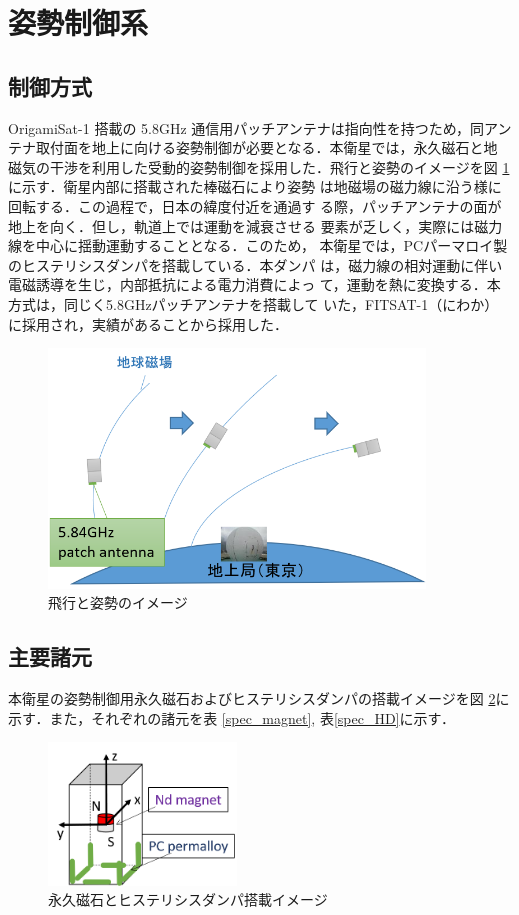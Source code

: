 \section{姿勢制御系}

\subsection{制御方式}
OrigamiSat-1 搭載の 5.8GHz 通信用パッチアンテナは指向性を持つため，同アン
テナ取付面を地上に向ける姿勢制御が必要となる．本衛星では，永久磁石と地
磁気の干渉を利用した受動的姿勢制御を採用した．飛行と姿勢のイメージを図
\ref{image_attitude_ctrl}に示す．衛星内部に搭載された棒磁石により姿勢
は地磁場の磁力線に沿う様に回転する．この過程で，日本の緯度付近を通過す
る際，パッチアンテナの面が地上を向く．但し，軌道上では運動を減衰させる
要素が乏しく，実際には磁力線を中心に揺動運動することとなる．このため，
本衛星では，PCパーマロイ製のヒステリシスダンパを搭載している．本ダンパ
は，磁力線の相対運動に伴い電磁誘導を生じ，内部抵抗による電力消費によっ
て，運動を熱に変換する．本方式は，同じく5.8GHzパッチアンテナを搭載して
いた，FITSAT-1（にわか）に採用され，実績があることから採用した．

\begin{figure}[htbp]
	\centering
	\includegraphics[width=10cm]{03/fig/image_attitude_ctrl.png}
	\caption{飛行と姿勢のイメージ}
	\label{image_attitude_ctrl}
\end{figure}

\subsection{主要諸元}
本衛星の姿勢制御用永久磁石およびヒステリシスダンパの搭載イメージを図
\ref{image_mag_HD}に示す．また，それぞれの諸元を表
\ref{spec_magnet}, 表\ref{spec_HD}に示す．

\begin{figure}[htbp]
	\centering
	\includegraphics[width=5cm]{03/fig/image_mag_HD.png}
	\caption{永久磁石とヒステリシスダンパ搭載イメージ}
	\label{image_mag_HD}
\end{figure}

